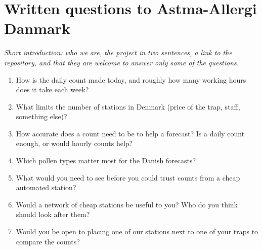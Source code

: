 \chapter{Written questions to Astma-Allergi Danmark}\label{app:expert-questions}


\textit{Short introduction: who we are, the project in two sentences, a link to the repository,
and that they are welcome to answer only some of the questions.}

\begin{enumerate}
  \item How is the daily count made today, and roughly how many working hours does it take each
  week?
  \item What limits the number of stations in Denmark (price of the trap, staff, something
  else)?
  \item How accurate does a count need to be to help a forecast? Is a daily count enough, or
  would hourly counts help?
  \item Which pollen types matter most for the Danish forecasts?
  \item What would you need to see before you could trust counts from a cheap automated station?
  \item Would a network of cheap stations be useful to you? Who do you think should look after
  them?
  \item Would you be open to placing one of our stations next to one of your traps to compare the
  counts?
\end{enumerate}
